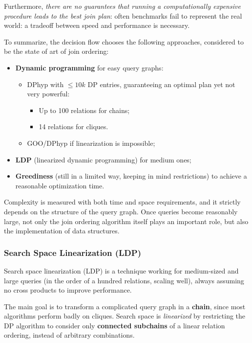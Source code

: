 Furthermore, \textit{there are no guarantees that running a computationally expensive procedure leads to the best join plan}: often benchmarks fail to represent the real world: a tradeoff between speed and performance is necessary.

To summarize, the decision flow chooses the following approaches, considered to be the state of art of join ordering:
\begin{itemize}
	\item \textbf{Dynamic programming} for easy query graphs:
	\begin{itemize}
		\item DPhyp with $\leq 10k$ DP entries, guaranteeing an optimal plan yet not very powerful:
		\begin{itemize}
			\item Up to 100 relations for chains;
			\item 14 relations for cliques.
		\end{itemize}
		\item GOO/DPhyp if linearization is impossible;
	\end{itemize}
	\item \textbf{LDP} (linearized dynamic programming) for medium ones;
	\item \textbf{Greediness} (still in a limited way, keeping in mind restrictions) to achieve a reasonable optimization time.
\end{itemize}

Complexity is measured with both time and space requirements, and it strictly depends on the structure of the query graph. Once queries become reasonably large, not only the join ordering
algorithm itself plays an important role, but also the implementation
of data structures.

\subsubsection{Search Space Linearization (LDP)}
Search space linearization (LDP) is a technique working for medium-sized and large queries (in the order of a hundred relations, scaling well), always assuming no cross products to improve performance. 

The main goal is to transform a complicated query graph in a \textbf{chain}, since most algorithms perform badly on cliques. Search space is \textit{linearized} by restricting the DP algorithm to consider only \textbf{connected subchains} of a linear relation ordering, instead of arbitrary combinations.

